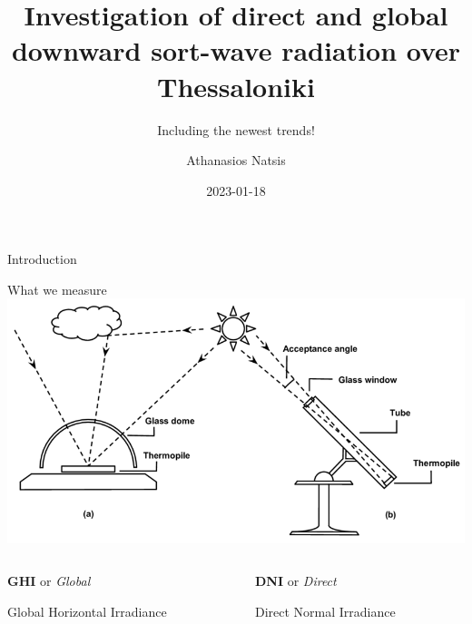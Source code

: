 \documentclass[
  ignorenonframetext,
]{beamer}
\title{Investigation of direct and global downward sort-wave radiation
over Thessaloniki}
\subtitle{Including the newest trends!}
\author{Athanasios Natsis}
\date{2023-01-18}
\begin{document}
\frame{\titlepage}
\ifdefined\Shaded\renewenvironment{Shaded}{\begin{tcolorbox}[borderline west={3pt}{0pt}{shadecolor}, breakable, boxrule=0pt, enhanced, frame hidden, interior hidden, sharp corners]}{\end{tcolorbox}}\fi

\begin{frame}{Introduction}
\protect\hypertarget{introduction}{}
\begin{block}{What we measure}
\protect\hypertarget{what-we-measure}{}
\includegraphics{images/Illustration-of-a-pyranometer-a-and-a-pyrheliometer.png}

\begin{columns}[T]
\begin{column}{0.5\textwidth}
\textbf{GHI} or \emph{Global}

Global Horizontal Irradiance
\end{column}

\begin{column}{0.5\textwidth}
\textbf{DNI} or \emph{Direct}

Direct Normal Irradiance
\end{column}
\end{columns}

~

\end{block}
\end{frame}
\end{document}
